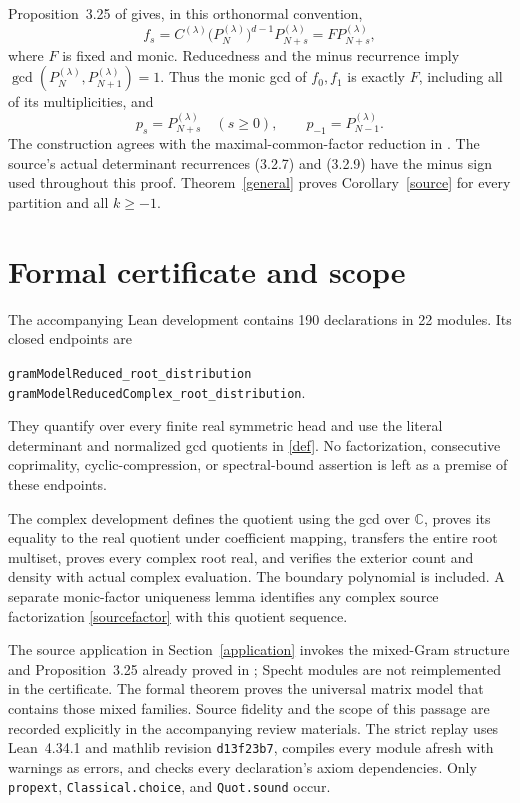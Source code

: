 \documentclass[11pt]{article}
\newcommand{\C}{\mathbb C}
\begin{document}
Proposition~3.25 of \cite{MM} gives, in this orthonormal convention,
\begin{equation}\label{sourcefactor}
 f_s=C^{(\lambda)}\bigl(P_N^{(\lambda)}\bigr)^{d-1}P_{N+s}^{(\lambda)}
     =F P_{N+s}^{(\lambda)},
\end{equation}
where $F$ is fixed and monic. Reducedness and the minus recurrence imply
$\gcd(P_N^{(\lambda)},P_{N+1}^{(\lambda)})=1$. Thus the monic gcd of
$f_0,f_1$ is exactly $F$, including all of its multiplicities, and
\[
 p_s=P_{N+s}^{(\lambda)}\quad(s\ge0),\qquad
 p_{-1}=P_{N-1}^{(\lambda)}.
\]
The construction agrees with the maximal-common-factor reduction
in \cite[(3.2.12)]{MM}. The source's actual determinant recurrences
(3.2.7) and (3.2.9) have the minus sign used throughout this proof.
Theorem~\ref{general} proves Corollary~\ref{source} for every partition and
all $k\ge-1$.

\section{Formal certificate and scope}
The accompanying Lean development contains 190 declarations in 22 modules.
Its closed endpoints are
\begin{center}
\texttt{gramModelReduced\_root\_distribution}\\
\texttt{gramModelReducedComplex\_root\_distribution}.
\end{center}
They quantify over every
finite real symmetric head and use the literal determinant and normalized
gcd quotients in \eqref{def}. No factorization, consecutive coprimality,
cyclic-compression, or spectral-bound assertion is left as a premise of
these endpoints.

The complex development defines the quotient using the gcd over $\C$,
proves its equality to the real quotient under coefficient mapping,
transfers the entire root multiset, proves every complex root real,
and verifies the exterior count and density with actual complex evaluation.
The boundary polynomial is included. A separate monic-factor uniqueness
lemma identifies any complex source factorization \eqref{sourcefactor}
with this quotient sequence.

The source application in Section~\ref{application} invokes the mixed-Gram
structure and Proposition~3.25 already proved in \cite{MM}; Specht modules
are not reimplemented in the certificate. The formal theorem proves the
universal matrix model that contains those mixed families. Source fidelity
and the scope of this passage are recorded explicitly in the accompanying
review materials.
The strict replay uses Lean~4.34.1 and mathlib revision \texttt{d13f23b7},
compiles every module afresh with warnings as errors, and checks every
declaration's axiom dependencies. Only \texttt{propext},
\texttt{Classical.choice}, and \texttt{Quot.sound} occur.
\end{document}
